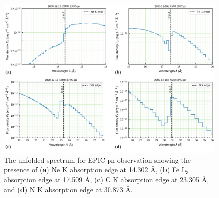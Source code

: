     \begin{figure}[!bht]
        \centering
        \includegraphics[width=\textwidth]{figures/eufspec/mr-vel-XMM-EPIC-pn-uf-all-edges}
        \caption{The unfolded spectrum for EPIC-pn observation showing the presence of (\textbf{a}) Ne K absorption edge at 14.302 \AA, (\textbf{b}) Fe L$_3$ absorption edge at 17.509 \AA, (\textbf{c}) O K absorption edge at 23.305 \AA, and (\textbf{d}) N K absorption edge at 30.873 \AA.}
        \label{fig:pn-uf:abs-edges}
    \end{figure}

